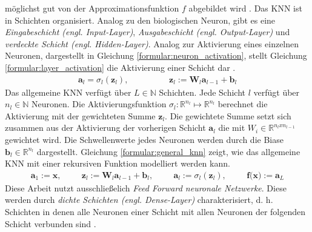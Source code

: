 möglichst gut von der Approximationsfunktion $f$ abgebildet wird \cite{bengio2017deep}.
\newline
\newline
Das KNN ist in Schichten organisiert. Analog zu den biologischen Neuron, gibt es eine \textit{Eingabeschicht (engl. Input-Layer)},
\textit{Ausgabeschicht (engl. Output-Layer)} und \textit{verdeckte Schicht (engl. Hidden-Layer)}.
Analog zur Aktivierung eines einzelnen Neuronen, dargestellt in Gleichung \ref{formular:neuron_activation}, stellt
Gleichung \ref{formular:layer_activation} die Aktivierung einer Schicht dar \cite{higham2019deep}.
\begin{align}
    \label{formular:layer_activation}
    \textbf{a}_{l} = \sigma_l(\textbf{z}_l), \hspace{2cm} \textbf{z}_l := \textbf{W}_l\textbf{a}_{l-1} + \textbf{b}_l
\end{align}
Das allgemeine KNN verfügt über $L\in\mathbb{N}$ Schichten. Jede Schicht $l$ verfügt über $n_l\in\mathbb{N}$ Neuronen.
Die Aktivierungsfunktion $\sigma_l:\mathbb{R}^{n_{l}}\mapsto\mathbb{R}^{n_{l}}$ berechnet die Aktivierung mit der gewichteten Summe $\textbf{z}_l$.
Die gewichtete Summe setzt sich zusammen aus der Aktivierung der vorherigen Schicht $\textbf{a}_l$ die mit $W_i\in\mathbb{R}^{n_{l}x{n_{l-1}}}$ gewichtet wird.
Die Schwellenwerte jedes Neuronen werden durch die Biase $\textbf{b}_l\in\mathbb{R}^{n_{l}}$ dargestellt.
Gleichung \ref{formular:general_knn} zeigt, wie das allgemeine KNN mit einer rekursiven Funktion modelliert werden kann.
\begin{align}
    \label{formular:general_knn}
    \textbf{a}_1 := \textbf{x}, \hspace{1cm}
    \textbf{z}_l := \textbf{W}_l\textbf{a}_{l-1} + \textbf{b}_l, \hspace{1cm}
    \textbf{a}_l := \sigma_l(\textbf{z}_l), \hspace{1cm} \textbf{f(x)} := \textbf{a}_L
\end{align}
Diese Arbeit nutzt ausschließelich \textit{Feed Forward neuronale Netzwerke}.
Diese werden durch \textit{dichte Schichten (engl. Dense-Layer)} charakterisiert, d. h. Schichten in denen alle Neuronen
einer Schicht mit allen Neuronen der folgenden Schicht verbunden sind \cite{bengio2017deep}.






